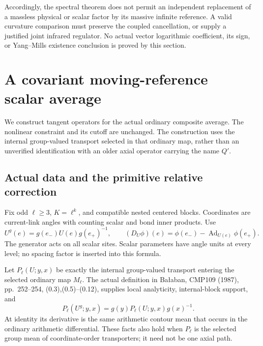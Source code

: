 \documentclass[11pt]{article}
\theoremstyle{remark}
\begin{document}
Accordingly, the spectral theorem does not permit an independent
replacement of a massless physical or scalar factor by its
massive infinite reference.
A valid curvature comparison must preserve the coupled
cancellation, or supply a justified joint infrared regulator.
No actual vector logarithmic coefficient, its sign, or
Yang--Mills existence conclusion is proved by this section.



\section{A covariant moving-reference scalar average}
\label{ccs-section}

We construct tangent operators for the actual ordinary composite
average. The nonlinear constraint and its cutoff are unchanged.
The construction uses the internal group-valued transport selected
in that ordinary map, rather than an unverified identification with
an older axial operator carrying the name \(Q'\).

\subsection{Actual data and the primitive relative correction}
\label{ccs-primitive-section}

Fix odd \(\ell\ge3\), \(K=\ell^k\), and compatible nested centered
blocks. Coordinates are current-link angles with counting scalar
and bond inner products. Use
\[
 U^g(e)=g(e_-)U(e)g(e_+)^{-1},\qquad
 (D_U\phi)(e)=\phi(e_-)-\operatorname{Ad}_{U(e)}\phi(e_+).
\]
The generator acts on all scalar sites. Scalar parameters have
angle units at every level; no spacing factor is inserted into
this formula.

Let \(P_\ell(U;y,x)\) be exactly the internal group-valued transport
entering the selected ordinary map \(M_\ell\). The actual definition
in Ba{\l}aban, CMP109 (1987), pp.~252--254, (0.3),(0.5)--(0.12),
supplies local analyticity, internal-block support, and
\begin{equation}
 P_\ell(U^g;y,x)=g(y)P_\ell(U;y,x)g(x)^{-1}.
 \label{ccs-endpoint}
\end{equation}
At identity its derivative is the same arithmetic contour mean
that occurs in the ordinary arithmetic differential.
These facts also hold when \(P_\ell\) is the selected group mean
of coordinate-order transporters; it need not be one axial path.
\end{document}

